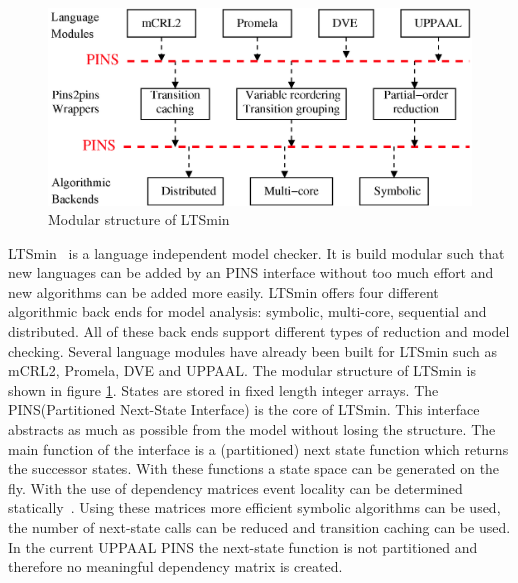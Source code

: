 \documentclass[11pt]{article}
\begin{document}
\begin{figure}[t] 
\includegraphics[width=\textwidth]{pins_modern}
\caption{Modular structure of LTSmin}
\label{fig:pins_modern}
\end{figure}

LTSmin~\cite{eemcs18152,ltsmin-mc:nmf2011} is a language independent model checker. It is build modular such that new languages can be added by an PINS interface without too much effort and new algorithms can be added more easily. LTSmin offers four different algorithmic back ends for model analysis: symbolic, multi-core, sequential and distributed. All of these back ends support different types of reduction and model checking. Several language modules have already been built for LTSmin such as mCRL2, Promela, DVE and UPPAAL. The modular structure of LTSmin is shown in figure \ref{fig:pins_modern}. States are stored in fixed length integer arrays. The PINS(Partitioned Next-State Interface) is the core of LTSmin. This interface abstracts as much as possible from the model without losing the structure. The main function of the interface is a (partitioned) next state function which returns the successor states. With these functions a state space can be generated on the fly. With the use of dependency matrices event locality can be determined statically~\cite{rwcmatrices}. Using these matrices more efficient symbolic algorithms can be used, the number of next-state calls can be reduced and transition caching can be used. In the current UPPAAL PINS the next-state function is not partitioned and therefore no meaningful dependency matrix is created. 
\end{document}
